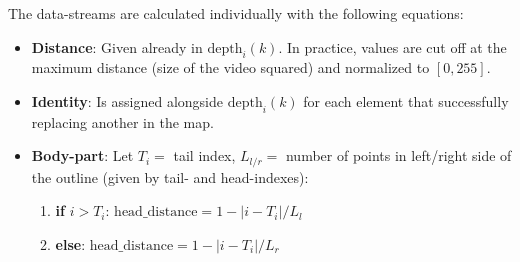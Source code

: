\documentclass[9pt,lineno]{elife}
\begin{document}
\begin{appendixbox}
The data-streams are calculated individually with the following equations:

\begin{itemize}
    \item \textbf{Distance}: Given already in $\mathrm{depth}_i(k)$. In practice, values are cut off at the maximum distance (size of the video squared) and normalized to $[0,255]$.
    \item \textbf{Identity}: Is assigned alongside $\mathrm{depth}_i(k)$ for each element that successfully replacing another in the map.
    \item \textbf{Body-part}: 
    Let $T_i =$ tail index, $L_{l/r} =$ number of points in left/right side of the outline (given by tail- and head-indexes):
    \begin{enumerate}
        \item \textbf{if} $i > T_i$: $\mathrm{head\_distance} = 1 - |i - T_i| / L_l$
        \item \textbf{else}: $\mathrm{head\_distance} = 1 - |i - T_i| / L_r$
    \end{enumerate}
\end{itemize}

\end{appendixbox}
\end{document}
